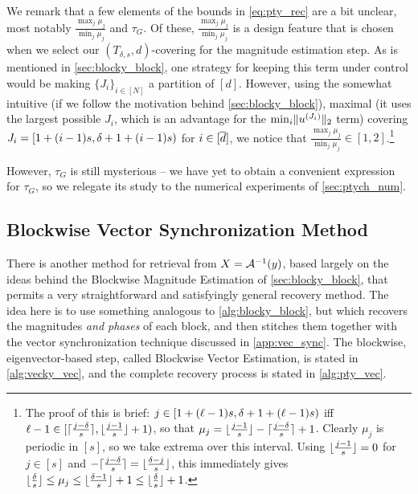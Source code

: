 We remark that a few elements of the bounds in \eqref{eq:pty_rec} are a bit unclear, most notably $\frac{\max_j \mu_j}{\min_j \mu_j}$ and $\tau_G$.  Of these, $\frac{\max_j \mu_j}{\min_j \mu_j}$ is a design feature that is chosen when we select our $(T_{\delta, s}, d)$-covering for the magnitude estimation step.  As is mentioned in \cref{sec:blocky_block}, one strategy for keeping this term under control would be making $\{J_i\}_{i \in [N]}$ a partition of $[d]$.  However, using the somewhat intuitive (if we follow the motivation behind \cref{sec:blocky_block}), maximal (it uses the largest possible $J_i$, which is an advantage for the $\min_i \lVert u^{(J_i)}\rVert_2$ term) covering $J_i = [1 + (i - 1)s, \delta + 1 + (i - 1)s)$ for $i \in [\overline{d}]$, we notice that $\frac{\max_j \mu_j}{\min_j \mu_j} \in [1, 2]$.\footnote{The proof of this is brief: $j \in [1 + (\ell - 1) s, \delta + 1 + (\ell - 1)s)$ iff $\ell - 1 \in [\lceil\frac{j- \delta}{s}\rceil, \lfloor\frac{j - 1}{s}\rfloor + 1)$, so that $\mu_j = \lfloor\frac{j - 1}{s}\rfloor - \lceil\frac{j - \delta}{s}\rceil + 1$.  Clearly $\mu_j$ is periodic in $[s]$, so we take extrema over this interval.  Using $\lfloor\frac{j-1}{s}\rfloor = 0$ for $j \in [s]$ and $-\lceil\frac{j - \delta}{s}\rceil = \lfloor\frac{\delta - j}{s}\rfloor$, this immediately gives $\lfloor\frac{\delta}{s}\rfloor \le \mu_j \le \lfloor\frac{\delta - 1}{s}\rfloor + 1 \le \lfloor\frac{\delta}{s}\rfloor + 1$.}

However, $\tau_G$ is still mysterious -- we have yet to obtain a convenient expression for $\tau_G$, so we relegate its study to the numerical experiments of \cref{sec:ptych_num}.

\subsection{Blockwise Vector Synchronization Method}
\label{sec:vecky_vec}
There is another method for retrieval from $X = \mathcal{A}^{-1}(y)$, based largely on the ideas behind the Blockwise Magnitude Estimation of \cref{sec:blocky_block}, that permits a very straightforward and satisfyingly general recovery method.  The idea here is to use something analogous to \cref{alg:blocky_block}, but which recovers the magnitudes \emph{and phases} of each block, and then stitches them together with the vector synchronization technique discussed in \cref{app:vec_sync}.  The blockwise, eigenvector-based step, called Blockwise Vector Estimation, is stated in \cref{alg:vecky_vec}, and the complete recovery process is stated in \cref{alg:pty_vec}.

